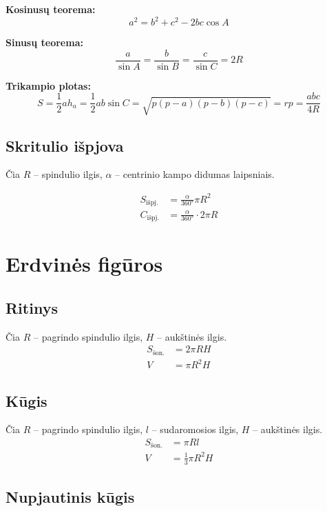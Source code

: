 \textbf{Kosinusų teorema:}
\[
a^2 = b^2 + c^2 - 2bc\cos A
\]

\textbf{Sinusų teorema:}
\[
\frac{a}{\sin A} = \frac{b}{\sin B} = \frac{c}{\sin C} = 2R
\]

\textbf{Trikampio plotas:}
\[
S = \frac{1}{2}ah_a = \frac{1}{2}ab\sin C
  = \sqrt{p(p-a)(p-b)(p-c)}
  = rp
  = \frac{abc}{4R}
\]

\subsection{Skritulio išpjova}

Čia $R$ – spindulio ilgis, $\alpha$ – centrinio kampo didumas laipsniais.

\begin{align}
S_{\text{išpj.}} &= \frac{\alpha}{360°}\pi R^2 \\[6pt]
C_{\text{išpj.}} &= \frac{\alpha}{360°} \cdot 2\pi R
\end{align}

\section{Erdvinės figūros}

\subsection{Ritinys}

Čia $R$ – pagrindo spindulio ilgis, $H$ – aukštinės ilgis.
\begin{align}
S_{\text{šon.}} &= 2\pi R H \\[6pt]
V &= \pi R^2 H
\end{align}

\subsection{Kūgis}

Čia $R$ – pagrindo spindulio ilgis, $l$ – sudaromosios ilgis, $H$ – aukštinės ilgis.
\begin{align}
S_{\text{šon.}} &= \pi R l \\[6pt]
V &= \frac{1}{3}\pi R^2 H
\end{align}

\subsection{Nupjautinis kūgis}

